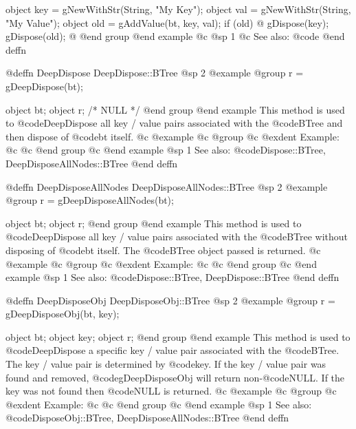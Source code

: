 object  key = gNewWithStr(String, "My Key");
object  val = gNewWithStr(String, "My Value");
object  old = gAddValue(bt, key, val);
if (old) @{
        gDispose(key);
        gDispose(old);
@}
@end group
@end example
@c @sp 1
@c See also:  @code{}
@end deffn














@deffn {DeepDispose} DeepDispose::BTree
@sp 2
@example
@group
r = gDeepDispose(bt);

object  bt;
object  r;     /*  NULL  */
@end group
@end example
This method is used to @code{DeepDispose} all key / value pairs
associated with the @code{BTree} and then dispose of @code{bt} itself.
@c @example
@c @group
@c @exdent Example:
@c 
@c @end group
@c @end example
@sp 1
See also:  @code{Dispose::BTree, DeepDisposeAllNodes::BTree}
@end deffn












@deffn {DeepDisposeAllNodes} DeepDisposeAllNodes::BTree
@sp 2
@example
@group
r = gDeepDisposeAllNodes(bt);

object  bt;
object  r;
@end group
@end example
This method is used to @code{DeepDispose} all key / value pairs
associated with the @code{BTree} without disposing of @code{bt} itself.
The @code{BTree} object passed is returned.
@c @example
@c @group
@c @exdent Example:
@c 
@c @end group
@c @end example
@sp 1
See also:  @code{Dispose::BTree, DeepDispose::BTree}
@end deffn











@deffn {DeepDisposeObj} DeepDisposeObj::BTree
@sp 2
@example
@group
r = gDeepDisposeObj(bt, key);

object  bt;
object  key;
object  r;
@end group
@end example
This method is used to @code{DeepDispose} a specific key / value pair
associated with the @code{BTree}.  The key / value pair is determined by
@code{key}.  If the key / value pair was found and removed,
@code{gDeepDisposeObj} will return non-@code{NULL}.  If the key was not
found then @code{NULL} is returned.
@c @example
@c @group
@c @exdent Example:
@c 
@c @end group
@c @end example
@sp 1
See also:  @code{DisposeObj::BTree, DeepDisposeAllNodes::BTree}
@end deffn


















